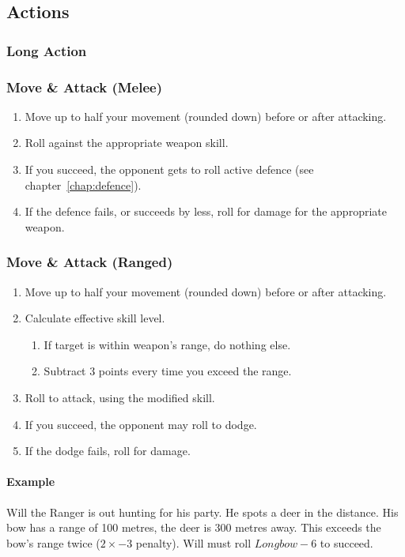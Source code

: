 \subsection{Actions}
\subsubsection{Long Action}

\subsubsection{Move \& Attack (Melee)}
\begin{enumerate}
    \item Move up to half your movement (rounded down) before or after attacking.
    \item Roll against the appropriate weapon skill.
    \item If you succeed, the opponent gets to roll active defence (see chapter~\ref{chap:defence}).
    \item If the defence fails, or succeeds by less, roll for damage for the appropriate weapon.
\end{enumerate}

\subsubsection{Move \& Attack (Ranged)}
\begin{enumerate}
    \item Move up to half your movement (rounded down) before or after attacking.
    \item Calculate effective skill level.
        \begin{enumerate}
            \item If target is within weapon's range, do nothing else.
            \item Subtract 3 points every time you exceed the range.
        \end{enumerate}
    \item Roll to attack, using the modified skill.
    \item If you succeed, the opponent may roll to dodge.
    \item If the dodge fails, roll for damage.
\end{enumerate}

\paragraph{Example} Will the Ranger is out hunting for his party. He spots a deer in the distance. His bow has a range of 100 metres, the deer is 300 metres away. This exceeds the bow's range twice ($2\times -3$ penalty). Will must roll $Longbow-6$ to succeed.

